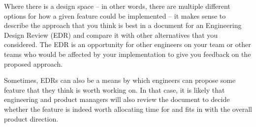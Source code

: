 Where there is a design space -- in other words, there are multiple different options for how a given feature could be implemented -- it makes sense to describe the approach that you think is best in a document for an Engineering Design Review (EDR) and compare it with other alternatives that you considered. The EDR is an opportunity for other engineers on your team or other teams who would be affected by your implementation to give you feedback on the proposed approach.

Sometimes, EDRs can also be a means by which engineers can propose some feature that they think is worth working on. In that case, it is likely that engineering and product managers will also review the document to decide whether the feature is indeed worth allocating time for and fits in with the overall product direction.
